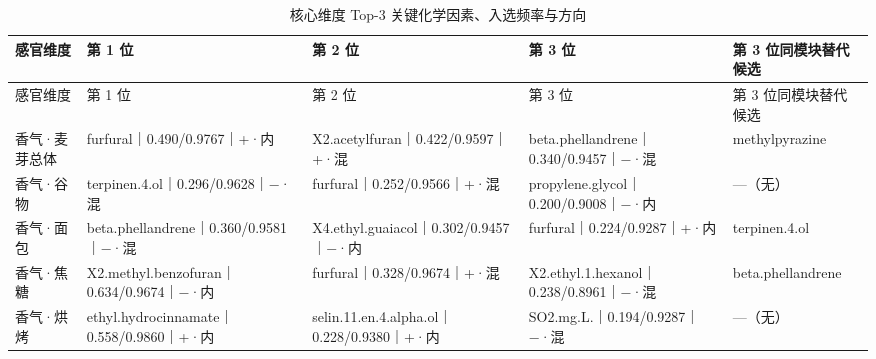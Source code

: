 \documentclass[11pt,a4paper]{article}
\renewcommand{\arraystretch}{1.12}
\newenvironment{bpLTsmall}{\small\renewcommand{\arraystretch}{1.02}}{}
\renewcommand{\arraystretch}{0.90}
\begin{document}
\begin{bpLTsmall}
\setcounter{table}{6}
\begin{longtable}{@{}>{\raggedright\arraybackslash}p{}>{\raggedright\arraybackslash}p{}>{\raggedright\arraybackslash}p{}>{\raggedright\arraybackslash}p{}>{\raggedright\arraybackslash}p{}@{}}
\caption{核心维度 Top-3 关键化学因素、入选频率与方向}\label{tab:q2-core-top3}\\
\toprule
感官维度 & 第 1 位 & 第 2 位 & 第 3 位 & 第 3 位同模块替代候选 \\
\midrule
\endfirsthead
\toprule
感官维度 & 第 1 位 & 第 2 位 & 第 3 位 & 第 3 位同模块替代候选 \\
\midrule
\endhead
\bottomrule
\endfoot
香气·\allowbreak{}麦芽总体 & furfural｜\allowbreak{}0.490/\allowbreak{}0.9767｜\allowbreak{}+·\allowbreak{}内 & X2.acetylfuran｜\allowbreak{}0.422/\allowbreak{}0.9597｜\allowbreak{}+·\allowbreak{}混 & beta.\allowbreak{}phellandrene｜\allowbreak{}0.340/\allowbreak{}0.9457｜\allowbreak{}−·\allowbreak{}混 & methylpyrazine \\
香气·\allowbreak{}谷物 & terpinen.4.ol｜\allowbreak{}0.296/\allowbreak{}0.9628｜\allowbreak{}−·\allowbreak{}混 & furfural｜\allowbreak{}0.252/\allowbreak{}0.9566｜\allowbreak{}+·\allowbreak{}混 & propylene.\allowbreak{}glycol｜\allowbreak{}0.200/\allowbreak{}0.9008｜\allowbreak{}−·\allowbreak{}内 & —（无） \\
香气·\allowbreak{}面包 & beta.\allowbreak{}phellandrene｜\allowbreak{}0.360/\allowbreak{}0.9581｜\allowbreak{}−·\allowbreak{}混 & X4.ethyl.\allowbreak{}guaiacol｜\allowbreak{}0.302/\allowbreak{}0.9457｜\allowbreak{}−·\allowbreak{}内 & furfural｜\allowbreak{}0.224/\allowbreak{}0.9287｜\allowbreak{}+·\allowbreak{}内 & terpinen.4.ol \\
香气·\allowbreak{}焦糖 & X2.methyl.\allowbreak{}benzofuran｜\allowbreak{}0.634/\allowbreak{}0.9674｜\allowbreak{}−·\allowbreak{}内 & furfural｜\allowbreak{}0.328/\allowbreak{}0.9674｜\allowbreak{}+·\allowbreak{}混 & X2.ethyl.1.hexanol｜\allowbreak{}0.238/\allowbreak{}0.8961｜\allowbreak{}−·\allowbreak{}混 & beta.\allowbreak{}phellandrene \\
香气·\allowbreak{}烘烤 & ethyl.\allowbreak{}hydrocinnamate｜\allowbreak{}0.558/\allowbreak{}0.9860｜\allowbreak{}+·\allowbreak{}内 & selin.11.en.4.alpha.\allowbreak{}ol｜\allowbreak{}0.228/\allowbreak{}0.9380｜\allowbreak{}+·\allowbreak{}内 & SO2.mg.\allowbreak{}L.｜\allowbreak{}0.194/\allowbreak{}0.9287｜\allowbreak{}−·\allowbreak{}混 & —（无） \\

\end{longtable}
\end{bpLTsmall}
\end{document}
